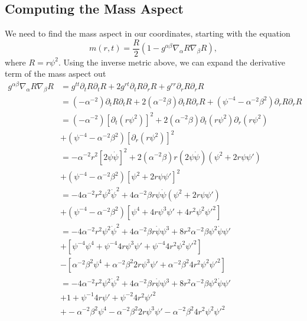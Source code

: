 \documentclass[12pt]{article}
\numberwithin{equation}{section}
\begin{document}
\subsection{Computing the Mass Aspect}
We need to find the mass aspect in our coordinates, starting with the equation
\begin{equation}
m(r, t) = \frac{R}{2} (1 - g^{\alpha \beta} \nabla_\alpha R \nabla_\beta R),
\end{equation}
where $R = r \psi^2$.  Using the inverse metric above, we can expand the derivative term of the mass aspect out
\begin{equation}
\begin{aligned}
g^{\alpha \beta} \nabla_\alpha R \nabla_\beta R &= g^{tt} \partial_t R \partial_t R + 2 g^{rt} \partial_t R \partial_r R + g^{rr} \partial_r R \partial_r R \\
&= (-\alpha^{-2}) \partial_t R \partial_t R + 2 (\alpha^{-2} \beta) \partial_t R \partial_r R + (\psi^{-4} - \alpha^{-2} \beta^2) \partial_r R \partial_r R \\
&= (-\alpha^{-2}) [\partial_t (r \psi^2)]^2 + 2 (\alpha^{-2} \beta) \partial_t (r \psi^2) \partial_r (r \psi^2) \\
&+ (\psi^{-4} - \alpha^{-2} \beta^2) [\partial_r (r \psi^2)]^2 \\
&= -\alpha^{-2} r^2 [2 \psi \dot{\psi}]^2 + 2 (\alpha^{-2} \beta) r (2 \psi \dot{\psi}) (\psi^2 + 2 r \psi \psi') \\
&+ (\psi^{-4} - \alpha^{-2} \beta^2) [\psi^2 + 2 r \psi \psi']^2 \\
&= -4 \alpha^{-2} r^2 \psi^2 \dot{\psi}^2 + 4 \alpha^{-2} \beta r \psi \dot{\psi} (\psi^2 + 2 r \psi \psi') \\
&+ (\psi^{-4} - \alpha^{-2} \beta^2) [\psi^4 + 4 r \psi^3 \psi' + 4 r^2 \psi^2 \psi'^2] \\
&= -4 \alpha^{-2} r^2 \psi^2 \dot{\psi}^2 + 4 \alpha^{-2} \beta r \dot{\psi} \psi^3 + 8 r^2 \alpha^{-2} \beta \psi^2 \dot{\psi} \psi' \\
&+ [\psi^{-4} \psi^4 + \psi^{-4} 4 r \psi^3 \psi' + \psi^{-4} 4 r^2 \psi^2 \psi'^2] \\
&- [\alpha^{-2} \beta^2 \psi^4 + \alpha^{-2} \beta^2 2 r \psi^3 \psi' + \alpha^{-2} \beta^2 4 r^2 \psi^2 \psi'^2] \\
&= -4 \alpha^{-2} r^2 \psi^2 \dot{\psi}^2 + 4 \alpha^{-2} \beta r \dot{\psi} \psi^3 + 8 r^2 \alpha^{-2} \beta \psi^2 \dot{\psi} \psi' \\
&+ 1 + \psi^{-1} 4 r \psi' + \psi^{-2} 4 r^2 \psi'^2 \\
&+ -\alpha^{-2} \beta^2 \psi^4 - \alpha^{-2} \beta^2 2 r \psi^3 \psi' - \alpha^{-2} \beta^2 4 r^2 \psi^2 \psi'^2 \\
\end{aligned}
\end{equation}
\end{document}
